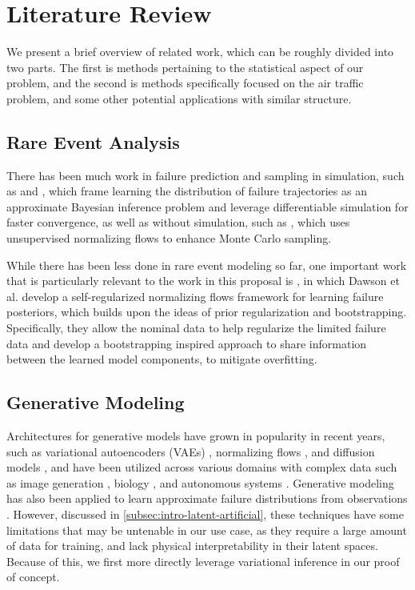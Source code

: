 \chapter{Literature Review}
\label{ch:lit-review}

We present a brief overview of related work, which can be roughly divided into two parts. The first is methods pertaining to the statistical aspect of our problem, and the second is methods specifically focused on the air traffic problem, and some other potential applications with similar structure.

\section{Rare Event Analysis}

There has been much work in failure prediction and sampling in simulation, such as \cite{pmlr-v211-delecki23a} and \cite{pmlr-v229-dawson23a}, which frame learning the distribution of failure trajectories as an approximate Bayesian inference problem and leverage differentiable simulation for faster convergence, as well as without simulation, such as \cite{Asghar2024EfficientRE}, which uses unsupervised normalizing flows to enhance Monte Carlo sampling. 

While there has been less done in rare event modeling so far, one important work that is particularly relevant to the work in this proposal is \cite{dawson2025rare}, in which Dawson et al. develop a self-regularized normalizing flows framework for learning failure posteriors, which builds upon the ideas of prior regularization \cite{abdollahzadeh2023surveygenerativemodelinglimited} and bootstrapping. Specifically, they allow the nominal data to help regularize the limited failure data and develop a bootstrapping inspired approach to share information between the learned model components, to mitigate overfitting. 

\section{Generative Modeling}
\label{related-generative-modeling}

Architectures for generative models have grown in popularity in recent years, such as variational autoencoders (VAEs) \cite{kingma2022autoencodingvariationalbayes,li2024deep, chevrot2022cae}, normalizing flows \cite{papamakarios2021normalizing}, and diffusion models \cite{yang2023diffusion}, and have been utilized across various domains with complex data such as image generation \cite{doersch2016tutorial}, biology \cite{guo2023diffusionmodelsbioinformaticsnew}, and autonomous systems \cite{xu2023diffscene}. Generative modeling has also been applied to learn approximate failure distributions from observations \cite{yue2023gan,pinto2023deep}. However, discussed in \cref{subsec:intro-latent-artificial}, these techniques have some limitations that may be untenable in our use case, as they require a large amount of data for training, and lack physical interpretability in their latent spaces. Because of this, we first more directly leverage variational inference \cite{hoffman2013stochastic} in our proof of concept.


